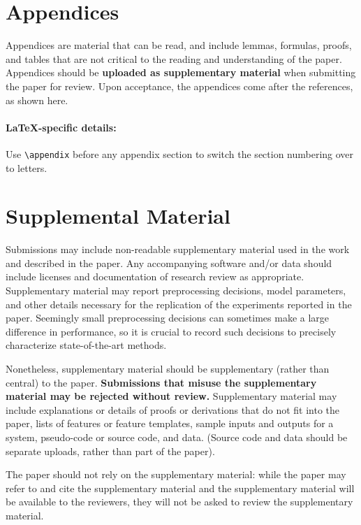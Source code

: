 \documentclass[11pt,a4paper]{article}
\begin{document}



\appendix

\section{Appendices}
\label{sec:appendix}
Appendices are material that can be read, and include lemmas, formulas, proofs, and tables that are not critical to the reading and understanding of the paper. 
Appendices should be \textbf{uploaded as supplementary material} when submitting the paper for review.
Upon acceptance, the appendices come after the references, as shown here.

\paragraph{\LaTeX-specific details:}
Use {\small\verb|\appendix|} before any appendix section to switch the section numbering over to letters.


\section{Supplemental Material}
\label{sec:supplemental}
Submissions may include non-readable supplementary material used in the work and described in the paper.
Any accompanying software and/or data should include licenses and documentation of research review as appropriate.
Supplementary material may report preprocessing decisions, model parameters, and other details necessary for the replication of the experiments reported in the paper.
Seemingly small preprocessing decisions can sometimes make a large difference in performance, so it is crucial to record such decisions to precisely characterize state-of-the-art methods. 

Nonetheless, supplementary material should be supplementary (rather than central) to the paper.
\textbf{Submissions that misuse the supplementary material may be rejected without review.}
Supplementary material may include explanations or details of proofs or derivations that do not fit into the paper, lists of
features or feature templates, sample inputs and outputs for a system, pseudo-code or source code, and data.
(Source code and data should be separate uploads, rather than part of the paper).

The paper should not rely on the supplementary material: while the paper may refer to and cite the supplementary material and the supplementary material will be available to the reviewers, they will not be asked to review the supplementary material.
\end{document}
